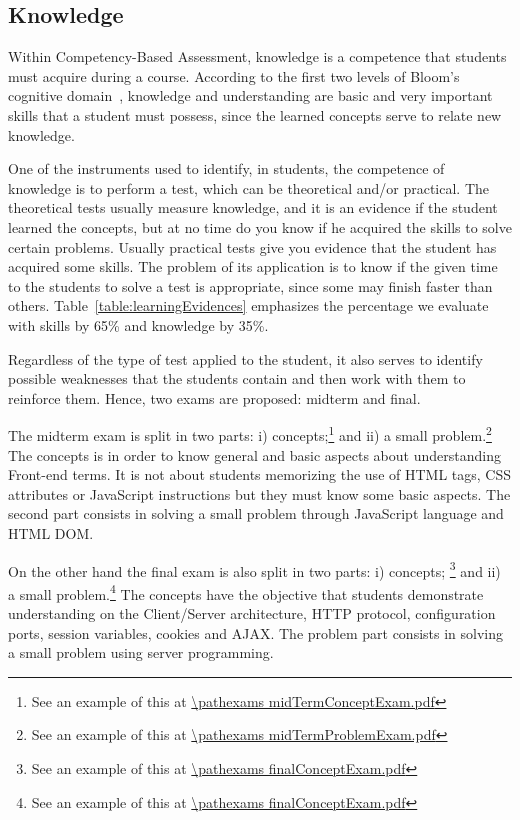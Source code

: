 \subsection{Knowledge}
Within Competency-Based Assessment, knowledge is a competence that students must acquire during 
a course. According to the first two levels of Bloom's cognitive domain~\cite{BloomTaxonomy2001}, 
knowledge and understanding are basic and very important skills that a student must possess, 
since the learned concepts serve to relate new knowledge.

One of the instruments used to identify, in students, the competence of knowledge is to perform a 
test, which can be theoretical and/or practical. 
The theoretical tests usually measure knowledge, and it is an evidence if the student learned the concepts, 
but at no time do you know if he acquired the skills to solve certain problems.
Usually practical tests give you evidence that the student has acquired some skills. The problem of 
its application is to know if the given time to the students to solve a test is appropriate, since 
some may finish faster than others.  Table~\ref{table:learningEvidences} emphasizes the percentage we 
evaluate with skills by 65\% and knowledge by 35\%.


Regardless of the type of test applied to the student, it also serves to identify possible weaknesses 
that the students contain and then work with them to reinforce them. Hence, two exams are proposed: 
midterm and final.

The midterm exam is split in two parts:
i) concepts;\footnote{See an example of this at \url{\pathexams midTermConceptExam.pdf}} and 
ii) a small problem.\footnote{See an example of this at \url{\pathexams midTermProblemExam.pdf}} 
The concepts is in order to know general and basic aspects about understanding Front-end terms. 
It is not about students memorizing the use of HTML tags, CSS attributes or JavaScript instructions 
but they must know some basic aspects. The second part consists in solving a small problem through 
JavaScript language and HTML DOM.

On the other hand the final exam is also split in two parts: 
i) concepts; \footnote{See an example of this at \url{\pathexams finalConceptExam.pdf}} and 
ii) a small problem.\footnote{See an example of this at \url{\pathexams finalConceptExam.pdf}} 
The concepts have the objective that students demonstrate understanding on the Client/Server 
architecture, HTTP protocol, configuration ports, session variables, cookies and AJAX. 
The problem part consists in solving a small problem using server programming.
